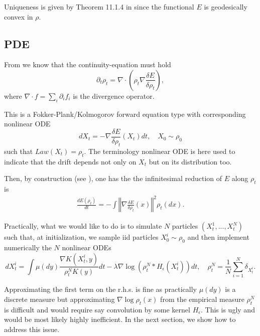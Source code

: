 \documentclass[a4paper]{article}
\theoremstyle{definition}
\begin{document}
Uniqueness is given by Theorem 11.1.4 in \cite{ambrosio2008gradient} since the functional $E$ is geodesically convex in $\rho$.

\subsection{PDE}
From \citet[Definition 11.1.1]{ambrosio2008gradient} we know that the continuity-equation must hold
\begin{equation}
\label{eq:pde}
\partial_{t}\rho_{t}=\nabla\cdot\left(\rho_{t}\nabla\frac{\delta E}{\delta\rho_{t}}\right),
\end{equation}
where $\nabla\cdot f=\sum_{i}\partial_{i}f_{i}$ is the divergence operator.

This is a Fokker-Plank/Kolmogorov forward equation type with corresponding nonlinear ODE \citep{jordan1998variational}
\begin{equation}
dX_{t}=-\nabla\frac{\delta E}{\delta\rho_{t}}\left(X_{t}\right)dt,\quad X_{0}\sim\rho_{0}\label{eq:nonlinearODE}
\end{equation}
such that $Law(X_{t})=\rho_{t}$.
The terminology nonlinear ODE is here used to indicate that the drift depends not only on $X_{t}$ but on its distribution too.

Then, by construction (see \citet[page 14]{arbel2019maximum}), one has the the infinitesimal reduction of $E$ along $\rho_t$ is
\begin{align*}
\frac{dE\left(\rho_{t}\right)}{dt}=-\int\left\Vert \nabla\frac{\delta E}{\delta\rho_{t}}\left(x\right)\right\Vert ^{2}\rho_{t}\left(dx\right).
\end{align*}


Practically, what we would like to do is to simulate $N$ particles $(X_{t}^{1},...,X_{t}^{N})$ such that, at initialization, we sample iid particles  $X_{0}^{i}\sim\rho_{0}$ and then implement numerically the $N$ nonlinear ODEs
\[
dX_{t}^{i}=\int\mu\left(dy\right)\frac{\nabla K(X_{t}^{i},y)}{\rho_{t}^{N}K(y)}dt-\lambda\nabla\log\left(\rho_{t}^{N}*H_{\epsilon}\left(X_{t}^{i}\right)\right)dt,\quad\rho_{t}^{N}=\frac{1}{N}\sum_{i=1}^{N}\delta_{X_{t}^{i}}.
\]

Approximating the first term on the r.h.s. is fine as practically $\mu\left(dy\right)$ is a discrete measure but approximating $\nabla\log\rho_{t}\left(x\right)$ from the empirical measure $\rho_{t}^{N}$ is difficult and would require say convolution by some kernel $H_{\epsilon}$.
This is ugly and would be most likely highly inefficient.
In the next section, we show how to address this issue.
\end{document}
